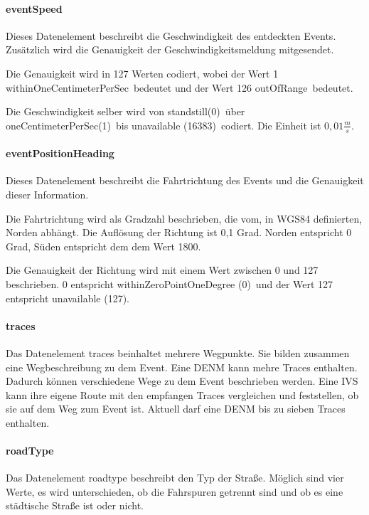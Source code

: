 \paragraph{eventSpeed}
Dieses Datenelement beschreibt die Geschwindigkeit des entdeckten Events. Zusätzlich wird die Genauigkeit der Geschwindigkeitsmeldung mitgesendet. 

Die Genauigkeit wird in 127 Werten codiert, wobei der Wert 1 \glqq withinOneCentimeterPerSec\grqq~bedeutet und der Wert 126 \glqq outOfRange\grqq~bedeutet. 

Die Geschwindigkeit selber wird von \glqq standstill(0)\grqq~über \glqq oneCentimeterPerSec(1)\grqq~bis \glqq unavailable (16383)\grqq~codiert. Die Einheit ist $0,01 \frac{m}{s}$.

\paragraph{eventPositionHeading}
Dieses Datenelement beschreibt die Fahrtrichtung des Events und die Genauigkeit dieser Information. 

Die Fahrtrichtung wird als Gradzahl beschrieben, die vom, in WGS84 definierten, Norden abhängt. Die Auflösung der Richtung ist 0,1 Grad. Norden entspricht 0 Grad, Süden entspricht dem dem Wert 1800.

Die Genauigkeit der Richtung wird mit einem Wert zwischen 0 und 127 beschrieben. 0 entspricht \glqq withinZeroPointOneDegree (0)\grqq~und der Wert 127 entspricht \glqq unavailable (127)\grqq.

\paragraph{traces}
Das Datenelement traces beinhaltet mehrere Wegpunkte. Sie bilden zusammen eine Wegbeschreibung zu dem Event. Eine \ac{DENM} kann mehre Traces enthalten. Dadurch können verschiedene Wege zu dem Event beschrieben werden. Eine \ac{IVS} kann ihre eigene Route mit den empfangen Traces	 vergleichen und feststellen, ob sie auf dem Weg zum Event ist. Aktuell darf eine \ac{DENM} bis zu sieben Traces enthalten.


\paragraph{roadType}
Das Datenelement roadtype beschreibt den Typ der Straße. Möglich sind vier Werte, es wird unterschieden, ob die Fahrspuren getrennt sind und ob es eine städtische Straße ist oder nicht. 


